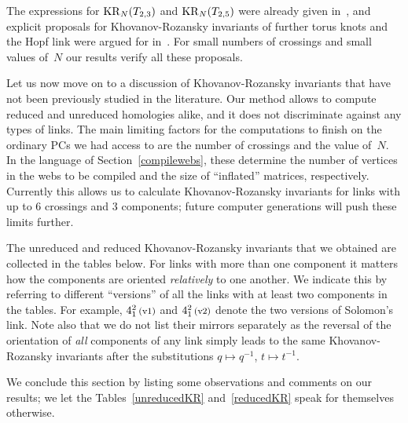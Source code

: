 \documentclass{compositio}
\theoremstyle{definition}
\numberwithin{equation}{section}
\begin{document}
The expressions for $\operatorname{KR}_{N}(T_{2,3})$ and $\operatorname{KR}_{N}(T_{2,5})$ were already given in~\cite{gsv0412243}, and explicit proposals for Khovanov-Rozansky invariants of further torus knots and the Hopf link were argued for in~\cite{dgr0505662, gikv0705.1368, as1105.5117}. For small numbers of crossings and small values of~$N$ our results verify all these proposals. 

\medskip

Let us now move on to a discussion of Khovanov-Rozansky invariants that have not been previously studied in the literature. Our method allows to compute reduced and unreduced homologies alike, and it does not discriminate against any types of links. The main limiting factors for the computations to finish on the ordinary PCs we had access to are the number of crossings and the value of~$N$. In the language of Section~\ref{compilewebs}, these determine the number of vertices in the webs to be compiled and the size of ``inflated'' matrices, respectively. Currently this allows us to calculate Khovanov-Rozansky invariants for links with up to 6 crossings and 3 components; future computer generations will push these limits further. 

The unreduced and reduced Khovanov-Rozansky invariants that we obtained are collected in the tables below. For links with more than one component it matters how the components are oriented \emph{relatively} to one another. We indicate this by referring to different ``versions'' of all the links with at least two components in the tables. For example, $4_{1}^2\,\text{{\footnotesize (v1)}}$ and $4_{1}^2\,\text{{\footnotesize (v2)}}$ denote the two versions of Solomon's link. Note also that we do not list their mirrors separately as the reversal of the orientation of \emph{all} components of any link simply leads to the same  Khovanov-Rozansky invariants after the substitutions $q\longmapsto q^{-1}$, $t\longmapsto t^{-1}$. 

We conclude this section by listing some observations and comments on our results; we let the Tables~\ref{unreducedKR} and~\ref{reducedKR} speak for themselves otherwise. 
\end{document}
